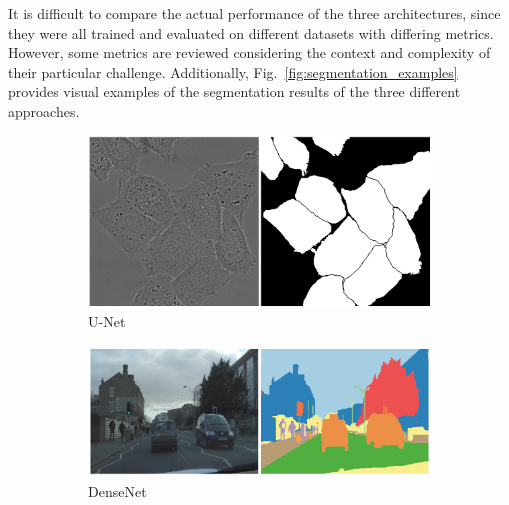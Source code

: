 It is difficult to compare the actual performance of the three architectures, since they were all trained and evaluated on different datasets with differing metrics. However, some metrics are reviewed considering the context and complexity of their particular challenge. Additionally, Fig.~\ref{fig:segmentation_examples} provides visual examples of the segmentation results of the three different approaches.

\begin{figure}
    \newcommand{\SegmentationExampleImageWidth}{0.3\textwidth}
    \centering
    \hfill
    \begin{subfigure}{\SegmentationExampleImageWidth}
        \includegraphics[width=\textwidth]{images/segmentation_example_unet}
        \caption{U-Net~\cite{unet15}}
        \label{fig:exseg_unet}
    \end{subfigure}
    \hfill
    \begin{subfigure}{0.4\textwidth}
        \includegraphics[width=\textwidth]{images/segmentation_example_densenet}
        \caption{DenseNet~\cite{denseseg17}}
        \label{fig:exseg_densenet}
    \end{subfigure}
    \hfill
    \begin{subfigure}{0.21\textwidth}

\end{subfigure}
\end{figure}
